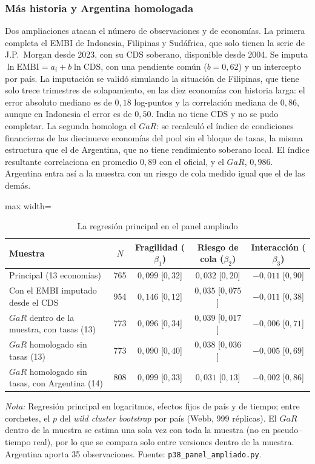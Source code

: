 \subsubsection{Más historia y Argentina homologada}
\label{sec:ampliado}

Dos ampliaciones atacan el número de observaciones y de economías. La primera completa el EMBI de Indonesia, Filipinas y Sudáfrica, que solo tienen la serie de J.P.\ Morgan desde 2023, con su CDS soberano, disponible desde 2004. Se imputa $\ln\mathrm{EMBI}=a_i+b\ln\mathrm{CDS}$, con una pendiente común ($b=0{,}62$) y un intercepto por país. La imputación se validó simulando la situación de Filipinas, que tiene solo trece trimestres de solapamiento, en las diez economías con historia larga: el error absoluto mediano es de $0{,}18$ log-puntos y la correlación mediana de $0{,}86$, aunque en Indonesia el error es de $0{,}50$. India no tiene CDS y no se pudo completar. La segunda homologa el $GaR$: se recalculó el índice de condiciones financieras de las diecinueve economías del pool sin el bloque de tasas, la misma estructura que el de Argentina, que no tiene rendimiento soberano local. El índice resultante correlaciona en promedio $0{,}89$ con el oficial, y el $GaR$, $0{,}986$. Argentina entra así a la muestra con un riesgo de cola medido igual que el de las demás.

\begin{table}[htbp]
\centering
\small
\caption[Panel ampliado]{La regresión principal en el panel ampliado}
\label{tab:ampliado}
\begin{adjustbox}{max width=\linewidth}
\begin{tabular}{l c ccc}
\toprule
Muestra & $N$ & Fragilidad ($\beta_1$) & Riesgo de cola ($\beta_2$) & Interacción ($\beta_3$) \\
\midrule
Principal (13 economías) & 765 & $0{,}099$ [$0{,}32$] & $0{,}032$ [$0{,}20$] & $-0{,}011$ [$0{,}90$] \\
Con el EMBI imputado desde el CDS & 954 & $0{,}146$ [$0{,}12$] & $0{,}035$ [$0{,}075$] & $-0{,}011$ [$0{,}38$] \\
\addlinespace
$GaR$ dentro de la muestra, con tasas (13) & 773 & $0{,}096$ [$0{,}34$] & $0{,}039$ [$0{,}017$] & $-0{,}006$ [$0{,}71$] \\
$GaR$ homologado sin tasas (13) & 773 & $0{,}090$ [$0{,}40$] & $0{,}038$ [$0{,}036$] & $-0{,}005$ [$0{,}69$] \\
$GaR$ homologado sin tasas, con Argentina (14) & 808 & $0{,}099$ [$0{,}33$] & $0{,}031$ [$0{,}13$] & $-0{,}002$ [$0{,}86$] \\
\bottomrule
\end{tabular}
\end{adjustbox}
\par\smallskip\parbox{0.95\linewidth}{\footnotesize \textit{Nota:} Regresión principal en logaritmos, efectos fijos de país y de tiempo; entre corchetes, el $p$ del \textit{wild cluster bootstrap} por país (Webb, 999 réplicas). El $GaR$ dentro de la muestra se estima una sola vez con toda la muestra (no en pseudo--tiempo real), por lo que se compara solo entre versiones dentro de la muestra. Argentina aporta 35 observaciones. Fuente: \texttt{p38\_panel\_ampliado.py}.}
\end{table}

